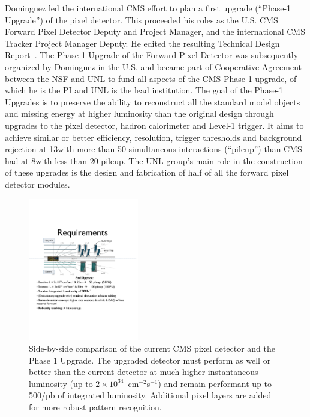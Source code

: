 Dominguez led the international CMS effort to plan a first upgrade (``Phase-1 Upgrade'') of the pixel detector. This proceeded his roles as the U.S. CMS Forward Pixel Detector Deputy and Project Manager, and the international CMS Tracker Project Manager Deputy.  He edited the resulting Technical Design Report~\cite{bib:pixTDR}.  The Phase-1 Upgrade of the Forward Pixel Detector was subsequently organized by Dominguez in the U.S. and became part of Cooperative Agreement between the NSF and UNL to fund all aspects of the CMS Phase-1 upgrade, of which he is the PI and UNL is the lead institution.  The goal of the Phase-1 Upgrades is to preserve the ability to reconstruct all the standard model objects and missing energy at higher luminosity than the original design through upgrades to the pixel detector, hadron calorimeter and Level-1 trigger.  It aims to achieve similar or better efficiency, resolution, trigger thresholds and background rejection at 13\TeV with more than 50 simultaneous interactions (``pileup'') than CMS had at 8\TeV with less than 20 pileup.  The UNL group's main role in the construction of these upgrades is the design and fabrication of half of all the forward pixel detector modules.  
\begin{figure}
\centering\includegraphics[width=0.43\textwidth]{figs/Phase-1-cropped}
\caption{\label{fig:phase1}Side-by-side comparison of the current CMS pixel detector and the Phase 1 Upgrade.  The upgraded detector must perform as well or better than the current detector at much higher instantaneous luminosity (up to $2 \times 10^{34}$~cm$^{-2}$s$^{-1}$) and remain performant up to 500/pb of integrated luminosity.  Additional pixel layers are added for more robust pattern recognition.}
\end{figure}
